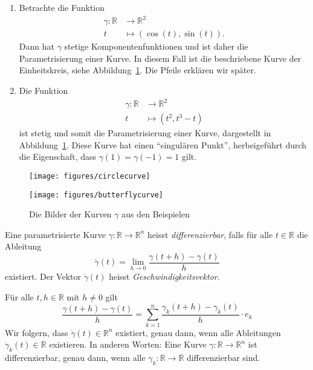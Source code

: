 \documentclass[../main.tex]{subfiles}
\begin{document}
\begin{example}
  \leavevmode
  \begin{enumerate}[(1)]
    \item 
      Betrachte die Funktion
      \begin{align*}
        \gamma \colon \mathbb{R} & \to \mathbb{R}^2 \\
        t & \mapsto (\cos(t), \sin(t)).
      \end{align*}
      Dann hat $\gamma$ stetige
      Komponentenfunktionen und ist
      daher die Parametrisierung einer Kurve.
      In diesem Fall ist die beschriebene Kurve
      der Einheitskreis, siehe Abbildung~\ref{fig:parametrisations}.
      Die Pfeile erklären wir später.
    \item Die Funktion
      \begin{align*}
        \gamma \colon \mathbb{R} & \to \mathbb{R}^2 \\
        t & \mapsto (t^2, t^3 - t)
      \end{align*}
      ist stetig und somit die Parametrisierung einer Kurve,
      dargestellt in Abbildung~\ref{fig:parametrisations}.
      Diese Kurve hat einen ``singulären Punkt'',
      herbeigeführt durch die Eigenschaft,
      dass $\gamma(1) = \gamma(-1) = 1$ gilt.
  \end{enumerate}
\end{example}

\begin{figure}[htb] 
  \centering
  \begin{minipage}{0.50\textwidth}
    \centering
    \texttt{[image: figures/circlecurve]}
  \end{minipage}%
  \begin{minipage}{0.50\textwidth}
    \centering
    \texttt{[image: figures/butterflycurve]}
  \end{minipage}%
  \caption{Die Bilder der Kurven $\gamma$ 
  aus den Beispielen}%
  \label{fig:parametrisations}
\end{figure}

\begin{definition}
  Eine parametrisierte Kurve $\gamma \colon \mathbb{R} \to \mathbb{R}^n$ 
  heisst \emph{differenzierbar}, falls für alle $t \in \mathbb{R}$ 
  die Ableitung
  \[
    \dot{\gamma}(t) = \lim_{h \to 0} \frac{ \gamma(t + h) - \gamma(t)}{h}
  \]
  existiert.
  Der Vektor $\dot{\gamma}(t)$ heisst \emph{Geschwindigkeitsvektor}.
\end{definition}

\begin{remark}
  Für alle $t, h \in \mathbb{R}$ mit $h \neq 0$ 
  gilt
  \[
    \frac{\gamma(t + h) - \gamma(t)}{h}
    = \sum_{k=1}^{n} \frac{\gamma_k(t + h)- \gamma_k(t)}{h} \cdot e_k
  \]
  Wir folgern, dass $\dot{\gamma}(t) \in \mathbb{R}^n$ existiert,
  genau dann, wenn alle Ableitungen $\dot{\gamma}_k(t) \in \mathbb{R}$ 
  existieren.
  In anderen Worten: Eine Kurve $\gamma \colon \mathbb{R} \to \mathbb{R}^n$ 
  ist differenzierbar, genau dann, wenn alle $\gamma_k \colon \mathbb{R}
  \to \mathbb{R}$ differenzierbar sind.
\end{remark}
\end{document}
